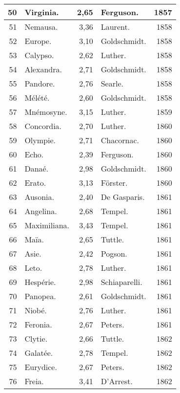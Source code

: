 \documentclass[a4paper, 11pt, oneside]{article}
\begin{document}
\begin{center}
\begin{longtable}{|r|l|r|l|r|}
        50 & Virginia. & 2,65 & Ferguson. & 1857 \\ \hline
        51 & Nemausa. & 3,36 & Laurent. & 1858 \\ \hline
        52 & Europe. & 3,10 & Goldschmidt. & 1858 \\ \hline
        53 & Calypso. & 2,62 & Luther. & 1858 \\ \hline
        54 & Alexandra. & 2,71 & Goldschmidt. & 1858 \\ \hline
        55 & Pandore. & 2,76 & Searle. & 1858 \\ \hline
        56 & Mélété. & 2,60 & Goldschmidt. & 1858 \\ \hline
        57 & Mnémosyne. & 3,15 & Luther. & 1859 \\ \hline
        58 & Concordia. & 2,70 & Luther. & 1860 \\ \hline
        59 & Olympie. & 2,71 & Chacornac. & 1860 \\ \hline
        60 & Echo. & 2,39 & Ferguson. & 1860 \\ \hline
        61 & Danaé. & 2,98 & Goldschmidt. & 1860 \\ \hline
        62 & Erato. & 3,13 & Förster. & 1860 \\ \hline
        63 & Ausonia. & 2,40 & De Gasparis. & 1861 \\ \hline
        64 & Angelina. & 2,68 & Tempel. & 1861 \\ \hline
        65 & Maximiliana. & 3,43 & Tempel. & 1861 \\ \hline
        66 & Maïa. & 2,65 & Tuttle. & 1861 \\ \hline
        67 & Asie. & 2,42 & Pogson. & 1861 \\ \hline
        68 & Leto. & 2,78 & Luther. & 1861 \\ \hline
        69 & Hespérie. & 2,98 & Schiaparelli. & 1861 \\ \hline
        70 & Panopea. & 2,61 & Goldschmidt. & 1861 \\ \hline
        71 & Niobé. & 2,76 & Luther. & 1861 \\ \hline
        72 & Feronia. & 2,67 & Peters. & 1861 \\ \hline
        73 & Clytie. & 2,66 & Tuttle. & 1862 \\ \hline
        74 & Galatée. & 2,78 & Tempel. & 1862 \\ \hline
        75 & Eurydice. & 2,67 & Peters. & 1862 \\ \hline
        76 & Freia. & 3,41 & D'Arrest. & 1862 \\ \hline

\end{longtable}
\end{center}
\end{document}
